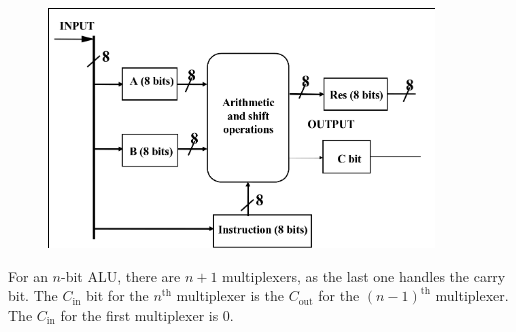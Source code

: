 \documentclass[a4paper, 12pt]{article}
\begin{document}
            \begin{figure}[h!]\includegraphics[width=\linewidth]{2019-04-08-20-08-22.png}\end{figure}

            For an $n$-bit ALU, there are $n + 1$ multiplexers, as the last one handles the carry bit. The $C_\text{in}$ bit for the $n^\text{th}$ multiplexer is the $C_\text{out}$ for the $(n - 1)^\text{th}$ multiplexer. The $C_\text{in}$ for the first multiplexer is 0.
\end{document}
